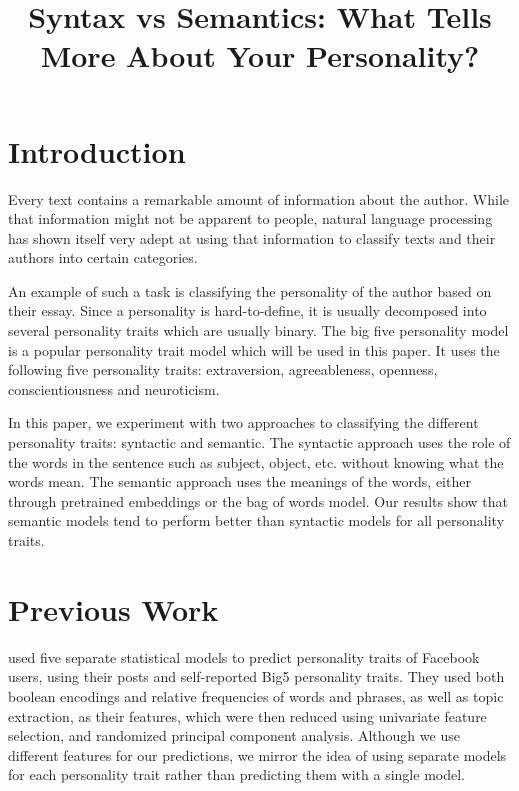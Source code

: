 \documentclass[10pt, a4paper]{article}
\title{Syntax vs Semantics: What Tells More About Your Personality?}
\begin{document}
\maketitleabstract

\section{Introduction}

Every text contains a remarkable amount of information about the author.
While that information might not be apparent to people, natural language processing has shown itself very adept at using that information to classify texts and their authors into certain categories.

An example of such a task is classifying the personality of the author based on their essay.
Since a personality is hard-to-define, it is usually decomposed into several personality traits which are usually binary.
The big five personality model is a popular personality trait model which will be used in this paper.
It uses the following five personality traits: extraversion, agreeableness, openness, conscientiousness and neuroticism.

In this paper, we experiment with two approaches to classifying the different personality traits: syntactic and semantic.
The syntactic approach uses the role of the words in the sentence such as subject, object, etc. without knowing what the words mean.
The semantic approach uses the meanings of the words, either through pretrained embeddings or the bag of words model.
Our results show that semantic models tend to perform better than syntactic models for all personality traits.

\section{Previous Work}

\citep{park} used five separate statistical models to predict personality traits of Facebook users, using their posts and self-reported Big5 personality traits.
They used both boolean encodings and relative frequencies of words and phrases, as well as topic extraction, as their features, which were then reduced using univariate feature selection, and randomized principal component analysis.
Although we use different features for our predictions, we mirror the idea of using separate models for each personality trait rather than predicting them with a single model.
\end{document}
